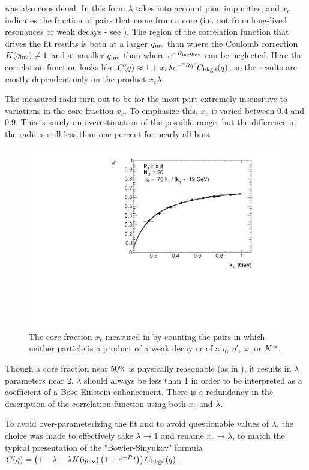 was also considered.
In this form $\lambda$ takes into account pion impurities, and $x_c$ indicates the fraction of pairs that come from a core (i.e. not from long-lived resonances or weak decays - see ).
The region of the correlation function that drives the fit results is both at a larger $q_{\mathrm{inv}}$ than where the Coulomb correction $K(q_{\mathrm{inv}}) \neq 1$ and at smaller $q_{\mathrm{inv}}$ than where $e^{-R_{\mathrm{inv}}q_{\mathrm{inv}}}$ can be neglected.
Here the correlation function looks like $C(q) \approx 1 + x_c \lambda e^{-"Rq"} C_{\textrm{bkgd}}(q)$, so the results are mostly dependent only on the product $x_c \lambda$.

The measured radii turn out to be for the most part extremely insensitive to variations in the core fraction $x_c$.
To emphasize this, $x_c$ is varied between 0.4 and 0.9.
This is surely an overestimation of the possible range, but the difference in the radii is still less than one percent for nearly all bins.

\begin{figure}[t]
\begin{minipage}[t]{1.0\textwidth}
\centering
\includegraphics[width=.49\linewidth]{pythia_xc.pdf}
\end{minipage}
\caption{The core fraction $x_c$ measured in  by counting the pairs in which neither particle is a product of a weak decay or of a $\eta$, $\eta'$, $\omega$, or $K*$.}
\label{fig:pythia_xc}
\end{figure}

Though a core fraction near 50\% is physically reasonable (as in ), it results in $\lambda$ parameters near 2.
$\lambda$ should always be less than 1 in order to be interpreted as a coefficient of a Bose-Einstein enhancement.
There is a redundancy in the description of the correlation function using both $x_c$ and $\lambda$.

To avoid over-parameterizing the fit and to avoid questionable values of $\lambda$, the choice was made to effectively take $\lambda \rightarrow 1$ and rename $x_c \rightarrow \lambda$, to match the typical presentation of the "Bowler-Sinyukov" formula $C(q) = \left( 1-\lambda + \lambda K(q_{\mathrm{inv}})\left( 1 + e^{-Rq} \right)\right) C_{\textrm{bkgd}}(q)$.

